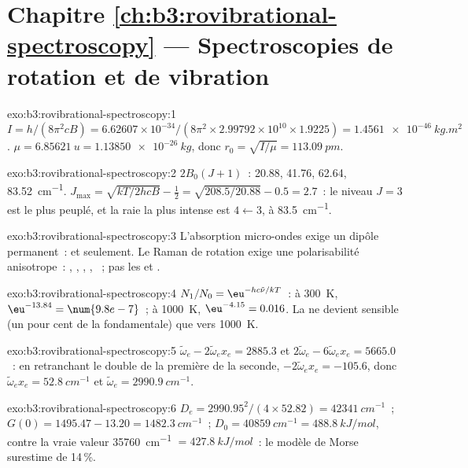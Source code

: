 \section*{Chapitre \ref{ch:b3:rovibrational-spectroscopy} --- Spectroscopies de rotation et de vibration}

\begin{solution}{exo:b3:rovibrational-spectroscopy:1}
$I = h/(8\pi^2cB) = 6.62607 \times 10^{-34}/(8\pi^2 \times 2.99792 \times 10^{10} \times
1.9225) = \qty{1.4561e-46}{kg.m^2}$. $\mu = \qty{6.85621}{u} = \qty{1.13850e-26}{kg}$, donc
$r_0 = \sqrt{I/\mu} = \qty{113.09}{pm}$.
\end{solution}

\begin{solution}{exo:b3:rovibrational-spectroscopy:2}
$2B_0(J+1)$~: 20.88, 41.76, 62.64, \qty{83.52}{cm^{-1}}. $J_{\max} = \sqrt{kT/2hcB} -
\frac12 = \sqrt{208.5/20.88} - 0.5 = 2.7$~: le niveau $J = 3$ est le plus
peuplé, et la raie la plus intense est $4 \leftarrow 3$, à
\qty{83.5}{cm^{-1}}.
\end{solution}

\begin{solution}{exo:b3:rovibrational-spectroscopy:3}
L'absorption micro-ondes exige un dipôle permanent~:  et 
seulement. Le Raman de rotation exige une polarisabilité anisotrope~:
, , ,
, ~; pas les   et .
\end{solution}

\begin{solution}{exo:b3:rovibrational-spectroscopy:4}
$N_1/N_0 = \eu^{-hc\tilde\nu/kT}$~: à \qty{300}{K}, $\eu^{-13.84} = \num{9.8e-7}$~; à
\qty{1000}{K}, $\eu^{-4.15} = 0.016$. La  ne devient sensible
(un pour cent de la fondamentale) que vers \qty{1000}{K}.
\end{solution}

\begin{solution}{exo:b3:rovibrational-spectroscopy:5}
$\tilde\omega_e - 2\tilde\omega_ex_e = 2885.3$ et $2\tilde\omega_e - 6\tilde\omega_ex_e =
5665.0$~: en retranchant le double de la première de la seconde, $-2\tilde\omega_ex_e = -105.6$,
donc $\tilde\omega_ex_e = \qty{52.8}{cm^{-1}}$ et $\tilde\omega_e = \qty{2990.9}{cm^{-1}}$.
\end{solution}

\begin{solution}{exo:b3:rovibrational-spectroscopy:6}
$D_e = 2990.95^2/(4 \times 52.82) = \qty{42341}{cm^{-1}}$~; $G(0) = 1495.47 - 13.20 =
\qty{1482.3}{cm^{-1}}$~; $D_0 = \qty{40859}{cm^{-1}} = \qty{488.8}{kJ/mol}$,
contre la vraie valeur
\qty{35760}{cm^{-1}} $= \qty{427.8}{kJ/mol}$~: le modèle de Morse
surestime de 14\,\%.
\end{solution}

